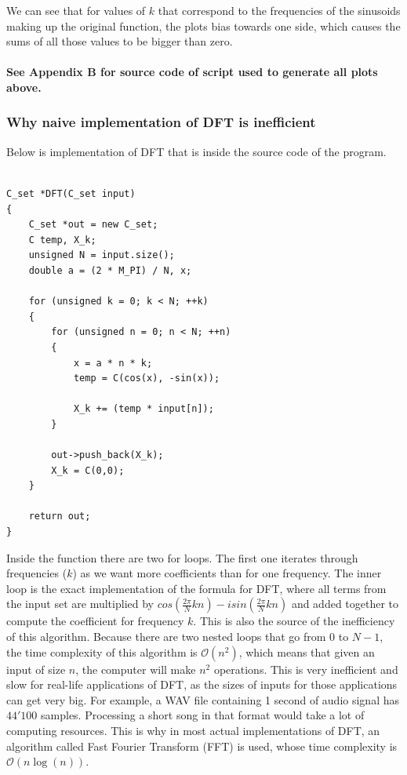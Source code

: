 \documentclass[titlepage]{article}
\begin{document}
    We can see that for values of $k$ that correspond to the frequencies of the
    sinusoids making up the original function, the plots bias towards one side,
    which causes the sums of all those values to be bigger than zero.
    
    \paragraph{See Appendix B for source code of script used to generate all plots above.}

\subsubsection{Why naive implementation of DFT is inefficient}

    Below is implementation of DFT that is inside the source code of the program.

    \begin{verbatim}

C_set *DFT(C_set input)
{
    C_set *out = new C_set;
    C temp, X_k;
    unsigned N = input.size();
    double a = (2 * M_PI) / N, x;

    for (unsigned k = 0; k < N; ++k)
    {
        for (unsigned n = 0; n < N; ++n)
        {
            x = a * n * k;
            temp = C(cos(x), -sin(x));

            X_k += (temp * input[n]);
        }

        out->push_back(X_k);
        X_k = C(0,0);
    }

    return out;
}
    \end{verbatim}

    Inside the function there are two for loops. The first one iterates through
    frequencies ($k$) as we want more coefficients than for one frequency. The 
    inner loop is the exact implementation of the formula for DFT, where all terms
    from the input set are multiplied by $cos\left(\frac{2\pi}{N}kn\right) - isin\left( 
    \frac{2\pi}{N}kn\right)$ and added together to compute the coefficient for 
    frequency $k$. This is also the source of the inefficiency of this algorithm.
    Because there are two nested loops that go from $0$ to $N-1$, the time complexity
    of this algorithm is $\mathcal{O}(n^2)$, which means that given an input of 
    size $n$, the computer will make $n^2$ operations. This is very inefficient
    and slow for real-life applications of DFT, as the sizes of inputs for those
    applications can get very big. For example, a WAV file containing 1 second of
    audio signal has $44'100$ samples. Processing a short song in that format
    would take a lot
    of computing resources. This is why in most actual implementations of DFT,
    an algorithm called Fast Fourier Transform (FFT) is used, whose time complexity
    is $\mathcal{O}(n\log(n))$.
\end{document}
